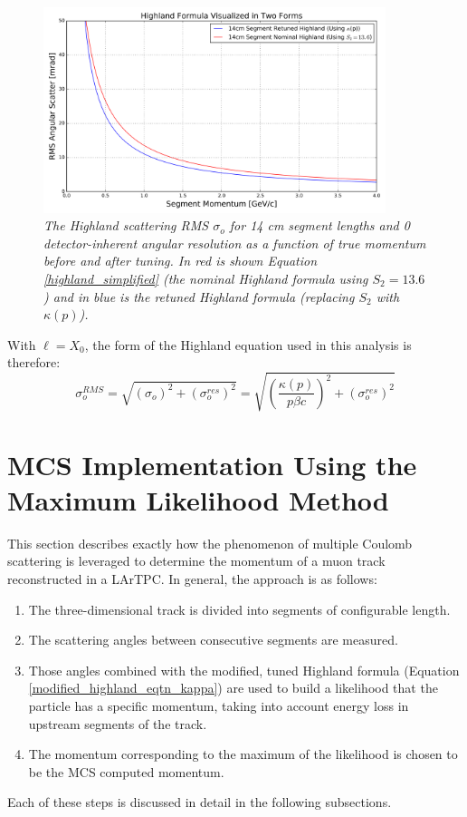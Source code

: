 \documentclass[a4paper,11pt]{article}
\begin{document}
\begin{figure}[ht!]
\begin{center}
\includegraphics[width=100mm]{Figures/highland_formula_visualized_twoforms.png}
\end{center}
\caption{\textit{The Highland scattering RMS $\sigma_o$ for 14 cm segment lengths and 0 detector-inherent angular resolution as a function of true momentum before and after tuning. In red is shown Equation \ref{highland_simplified} (the nominal Highland formula using $S_2 = 13.6$) and in blue is the retuned Highland formula (replacing $S_2$ with $\kappa(p)$).}}
\label{retune_highland_fig2}
\end{figure}

With ${\ell} = X_0$, the form of the Highland equation used in this analysis is therefore:
\begin{equation}\label{modified_highland_eqtn_kappa}
\sigma_{o}^{RMS} = \sqrt{ (\sigma_o)^2 + (\sigma_o^{res})^2} = \sqrt{ (\frac{\kappa(p)}{p\beta c})^2 + (\sigma_o^{res})^2 }
\end{equation}












\section{MCS Implementation Using the Maximum Likelihood Method}\label{MCS_technique_section}

This section describes exactly how the phenomenon of multiple Coulomb scattering is leveraged to determine the momentum of a muon track reconstructed in a LArTPC. In general, the approach is as follows:
\begin{enumerate}
\item The three-dimensional track is divided into segments of configurable length.
\item The scattering angles between consecutive segments are measured.
\item Those angles combined with the modified, tuned Highland formula (Equation \ref{modified_highland_eqtn_kappa}) are used to build a likelihood that the particle has a specific momentum, taking into account energy loss in upstream segments of the track.
\item The momentum corresponding to the maximum of the likelihood is chosen to be the MCS computed momentum.
\end{enumerate}
Each of these steps is discussed in detail in the following subsections.\\
\end{document}
